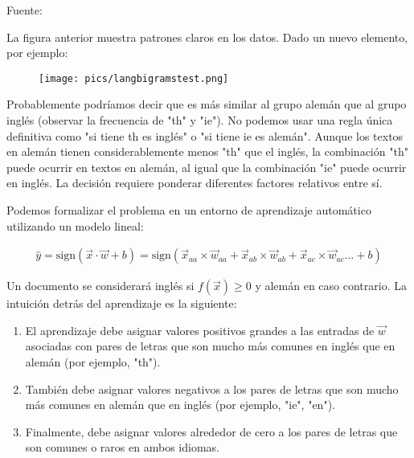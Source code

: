 Fuente: \cite{goldberg2017neural}

La figura anterior muestra patrones claros en los datos. Dado un nuevo elemento, por ejemplo:

\begin{figure}[htb]
	\centering
	 \texttt{[image: pics/langbigramstest.png]}
\end{figure}

Probablemente podríamos decir que es más similar al grupo alemán que al grupo inglés (observar la frecuencia de "th" y "ie"). No podemos usar una regla única definitiva como "si tiene th es inglés" o "si tiene ie es alemán". Aunque los textos en alemán tienen considerablemente menos "th" que el inglés, la combinación "th" puede ocurrir en textos en alemán, al igual que la combinación "ie" puede ocurrir en inglés. La decisión requiere ponderar diferentes factores relativos entre sí.

Podemos formalizar el problema en un entorno de aprendizaje automático utilizando un modelo lineal:

\begin{equation}
\begin{split}
\hat{y} = \text{sign}(\vec{x}\cdot \vec{w} + b) = \text{sign}(\vec{x}_{aa}\times \vec{w}_{aa}+ \vec{x}_{ab}\times \vec{w}_{ab}+ \vec{x}_{ac}\times \vec{w}_{ac} \dots +b)
\end{split}
\end{equation}

Un documento se considerará inglés si $f(\vec{x}) \geq 0$ y alemán en caso contrario. La intuición detrás del aprendizaje es la siguiente:

\begin{enumerate}
\item El aprendizaje debe asignar valores positivos grandes a las entradas de $\vec{w}$ asociadas con pares de letras que son mucho más comunes en inglés que en alemán (por ejemplo, "th").
\item También debe asignar valores negativos a los pares de letras que son mucho más comunes en alemán que en inglés (por ejemplo, "ie", "en").
\item Finalmente, debe asignar valores alrededor de cero a los pares de letras que son comunes o raros en ambos idiomas.
\end{enumerate}


